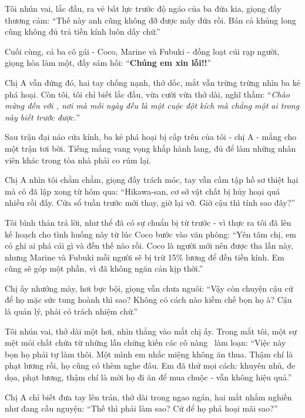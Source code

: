 \documentclass[../main.tex]{subfiles}
\begin{document}
Tôi nhún vai, lắc đầu, ra vẻ bất lực trước độ ngáo của ba đứa kia, giọng đầy thương cảm: ``Thế này anh cũng không đỡ được mấy đứa rồi. Bán cả khủng long cũng không đủ trả tiền kính luôn dấy chứ.''

Cuối cùng, cả ba cô gái - Coco, Marine và Fubuki - đồng loạt cúi rạp người, giọng hòa làm một, đầy sám hối: ``\textbf{Chúng em xin lỗi!!}''

Chị A vẫn đứng đó, hai tay chống nạnh, thở dốc, mắt vẫn trừng trừng nhìn ba kẻ phá hoại. Còn tôi, tôi chỉ biết lắc đầu, vừa cười vừa thở dài, nghĩ thầm: ``\textit{Chào mừng đến với \hll, nơi mà mỗi ngày đều là một cuộc đột kích mà chẳng một ai trong này biết trước được.}''

\omk

Sau trận đại náo cửa kính, ba kẻ phá hoại bị cấp trên của tôi - chị A - mắng cho một trận tơi bời. Tiếng mắng vang vọng khắp hành lang, đủ để làm những nhân viên khác trong tòa nhà phải co rúm lại.

Chị A nhìn tôi chằm chằm, giọng đầy trách móc, tay vẫn cầm tập hồ sơ thiệt hại mà cô đã lập xong từ hôm qua: ``Hikawa-san, cơ sở vật chất bị hủy hoại quá nhiều rồi đấy. Cửa sổ tuần trước mới thay, giờ lại vỡ. Giờ cậu thì tính sao đây?''

Tôi bình thản trả lời, như thể đã có sự chuẩn bị từ trước - vì thực ra tôi đã lên kế hoạch cho tình huống này từ lúc Coco bước vào văn phòng: ``Yên tâm chị, em có ghi ai phá cái gì và đền thế nào rồi. Coco là người mới nên được tha lần này, nhưng Marine và Fubuki mỗi người sẽ bị trừ 15\% lương để đền tiền kính. Em cũng sẽ góp một phần, vì đã không ngăn cản kịp thời.''

Chị ấy nhướng mày, hơi bực bội, giọng vẫn chưa nguôi: ``Vậy còn chuyện cậu cứ để họ mặc sức tung hoành thì sao? Không có cách nào kiềm chế bọn họ à? Cậu là quản lý, phải có trách nhiệm chứ.''

Tôi nhún vai, thở dài một hơi, nhìn thẳng vào mắt chị ấy. Trong mắt tôi, một sự mệt mỏi chất chứa từ những lần chứng kiến các cô nàng \hll\ làm loạn: ``Việc này bọn họ phải tự làm thôi. Một mình em nhắc miệng không ăn thua. Thậm chí là phạt lương rồi, họ cũng có thèm nghe đâu. Em đã thử mọi cách: khuyên nhủ, đe dọa, phạt lương, thậm chí là mời họ đi ăn để mua chuộc - vẫn không hiệu quả.''

Chị A chỉ biết đưa tay lên trán, thở dài trong ngao ngán, hai mắt nhắm nghiền như đang cầu nguyện: ``Thế thì phải làm sao? Cứ để họ phá hoại mãi sao?''
\end{document}
